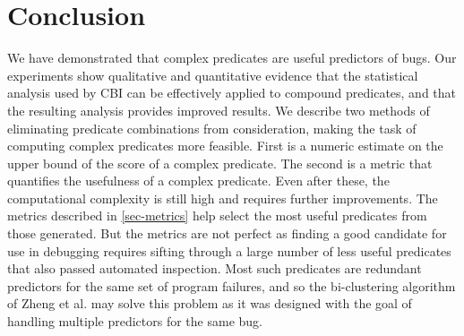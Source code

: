 
\section{Conclusion}
\label{sec-conc}
We have demonstrated that complex predicates are useful predictors of bugs.  
Our experiments show qualitative and quantitative evidence that the statistical 
analysis used by CBI can be effectively applied to compound predicates, and that
the resulting analysis provides improved results.  We describe
two methods of eliminating predicate combinations from consideration, making
the task of computing complex predicates more feasible.  First is a numeric 
estimate on the upper bound of the score of a complex predicate.  The second is 
a metric that quantifies the usefulness of a complex predicate.  Even after these, 
the computational complexity is still high and requires further improvements.  
The metrics described in \autoref{sec-metrics} help select the most useful predicates
from those generated.  But the metrics are not perfect as finding a good candidate
for use in debugging requires sifting through a large number of less useful predicates
that also passed automated inspection.  Most such predicates are redundant predictors
for the same set of program failures, and so the bi-clustering algorithm of Zheng et al. 
\cite{Zheng:2006:SDSIMB} may solve this problem as it was designed with the goal 
of handling multiple predictors for the same bug.
